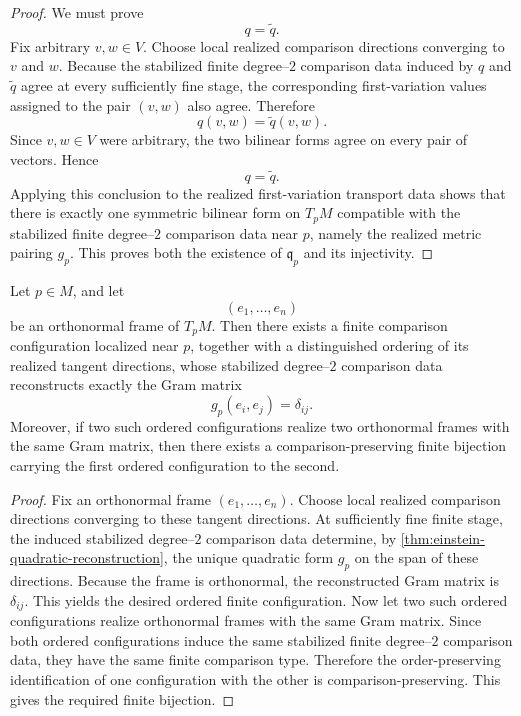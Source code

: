 \begin{proof}
	We must prove
	\[
		q=\widetilde q.
	\]
	Fix arbitrary \(v,w\in V\).
	Choose local realized comparison directions converging to \(v\) and \(w\).
	Because the stabilized finite degree--\(2\) comparison data induced by
	\(q\) and \(\widetilde q\) agree at every sufficiently fine stage, the
	corresponding first-variation values assigned to the pair \((v,w)\) also
	agree.
	Therefore
	\[
		q(v,w)=\widetilde q(v,w).
	\]
	Since \(v,w\in V\) were arbitrary, the two bilinear forms agree on every
	pair of vectors.
	Hence
	\[
		q=\widetilde q.
	\]
	Applying this conclusion to the realized first-variation transport data
	shows that there is exactly one symmetric bilinear form on \(T_pM\)
	compatible with the stabilized finite degree--\(2\) comparison data near
	\(p\), namely the realized metric pairing \(g_p\).
	This proves both the existence of \(\mathfrak q_p\) and its injectivity.
\end{proof}
\begin{theorem}
	\label{thm:einstein-frame-realization}
	Let \(p\in M\), and let
	\[
		(e_1,\dots,e_n)
	\]
	be an orthonormal frame of \(T_pM\).
	Then there exists a finite comparison configuration localized near
	\(p\), together with a distinguished ordering of its realized tangent
	directions, whose stabilized degree--\(2\) comparison data reconstructs
	exactly the Gram matrix
	\[
		g_p(e_i,e_j)=\delta_{ij}.
	\]
	Moreover, if two such ordered configurations realize two orthonormal
	frames with the same Gram matrix, then there exists a
	comparison-preserving finite bijection carrying the first ordered
	configuration to the second.
\end{theorem}
\begin{proof}
	Fix an orthonormal frame \((e_1,\dots,e_n)\).
	Choose local realized comparison directions converging to these tangent
	directions.
	At sufficiently fine finite stage, the induced stabilized degree--\(2\)
	comparison data determine, by
	\cref{thm:einstein-quadratic-reconstruction}, the unique quadratic form
	\(g_p\) on the span of these directions.
	Because the frame is orthonormal, the reconstructed Gram matrix is
	\(\delta_{ij}\).
	This yields the desired ordered finite configuration.
	Now let two such ordered configurations realize orthonormal frames with
	the same Gram matrix.
	Since both ordered configurations induce the same stabilized finite
	degree--\(2\) comparison data, they have the same finite comparison
	type.
	Therefore the order-preserving identification of one configuration with
	the other is comparison-preserving.
	This gives the required finite bijection.
\end{proof}
